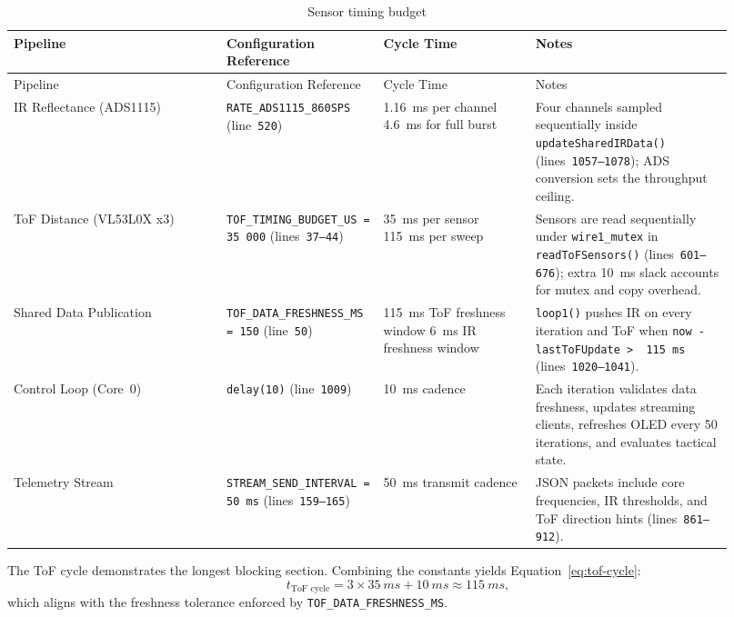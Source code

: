 \documentclass[11pt]{article}
\begin{document}
\begin{longtable}{@{}p{0.28\linewidth}p{0.18\linewidth}p{0.2\linewidth}p{0.26\linewidth}@{}}
\caption{Sensor timing budget}\label{tab:sensor-timing}\\
\toprule
Pipeline & Configuration Reference & Cycle Time & Notes \\
\midrule
\endfirsthead
\toprule
Pipeline & Configuration Reference & Cycle Time & Notes \\
\midrule
\endhead
\bottomrule
\endfoot
IR Reflectance (ADS1115) & \texttt{RATE\_ADS1115\_860SPS} (line~\texttt{520}) & \SI{1.16}{ms} per channel \newline \SI{4.6}{ms} for full burst & Four channels sampled sequentially inside \texttt{updateSharedIRData()} (lines~\texttt{1057--1078}); ADS conversion sets the throughput ceiling. \\
ToF Distance (VL53L0X x3) & \texttt{TOF\_TIMING\_BUDGET\_US = 35\,000} (lines~\texttt{37--44}) & \SI{35}{ms} per sensor \newline \SI{115}{ms} per sweep & Sensors are read sequentially under \texttt{wire1\_mutex} in \texttt{readToFSensors()} (lines~\texttt{601--676}); extra \SI{10}{ms} slack accounts for mutex and copy overhead. \\
Shared Data Publication & \texttt{TOF\_DATA\_FRESHNESS\_MS = 150} (line~\texttt{50}) & \SI{115}{ms} ToF freshness window \newline \SI{6}{ms} IR freshness window & \texttt{loop1()} pushes IR on every iteration and ToF when \texttt{now - lastToFUpdate \textgreater\, 115\,ms} (lines~\texttt{1020--1041}). \\
Control Loop (Core~0) & \texttt{delay(10)} (line~\texttt{1009}) & \SI{10}{ms} cadence & Each iteration validates data freshness, updates streaming clients, refreshes OLED every 50 iterations, and evaluates tactical state. \\
Telemetry Stream & \texttt{STREAM\_SEND\_INTERVAL = 50\,ms} (lines~\texttt{159--165}) & \SI{50}{ms} transmit cadence & JSON packets include core frequencies, IR thresholds, and ToF direction hints (lines~\texttt{861--912}). \\
\end{longtable}

The ToF cycle demonstrates the longest blocking section. Combining the constants yields Equation~\eqref{eq:tof-cycle}:
\begin{equation}
  t_{\text{ToF cycle}} = 3 \times \SI{35}{ms} + \SI{10}{ms} \approx \SI{115}{ms},
  \label{eq:tof-cycle}
\end{equation}
which aligns with the freshness tolerance enforced by \texttt{TOF\_DATA\_FRESHNESS\_MS}.
\end{document}
